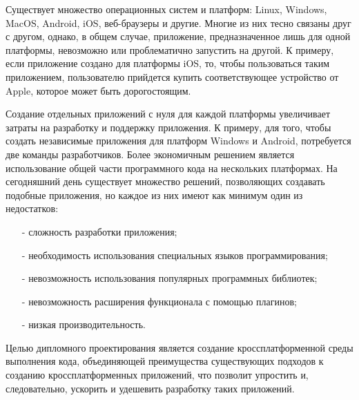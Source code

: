 Существует множество операционных систем и платформ: Linux, Windows, MacOS, Android, iOS, веб-браузеры и другие.
Многие из них тесно связаны друг с другом, однако, в общем случае, приложение, предназначенное лишь для одной платформы, невозможно или проблематично запустить на другой.
К примеру, если приложение создано для платформы iOS, то, чтобы пользоваться таким приложением, пользователю прийдется купить соответствующее устройство от Apple, которое может быть дорогостоящим.

Создание отдельных приложений с нуля для каждой платформы увеличивает затраты на разработку и поддержку приложения. 
К примеру, для того, чтобы создать независимые приложения для платформ Windows и Android, потребуется две команды разработчиков.
Более экономичным решением является использование общей части программного кода на нескольких платформах.
На сегодняшний день существует множество решений, позволяющих создавать подобные приложения, но каждое из них имеют как минимум один из недостатков:
\begin{itemize}
    \item[-] сложность разработки приложения;
    \item[-] необходимость использования специальных языков программирования;
    \item[-] невозможность использования популярных программных библиотек;
    \item[-] невозможность расширения функционала с помощью плагинов;
    \item[-] низкая производительность.
\end{itemize}

Целью дипломного проектирования является создание кроссплатформенной среды выполнения кода, объединяющей преимущества существующих подходов к созданию кроссплатформенных приложений, что позволит упростить и, следовательно, ускорить и удешевить разработку таких приложений.
